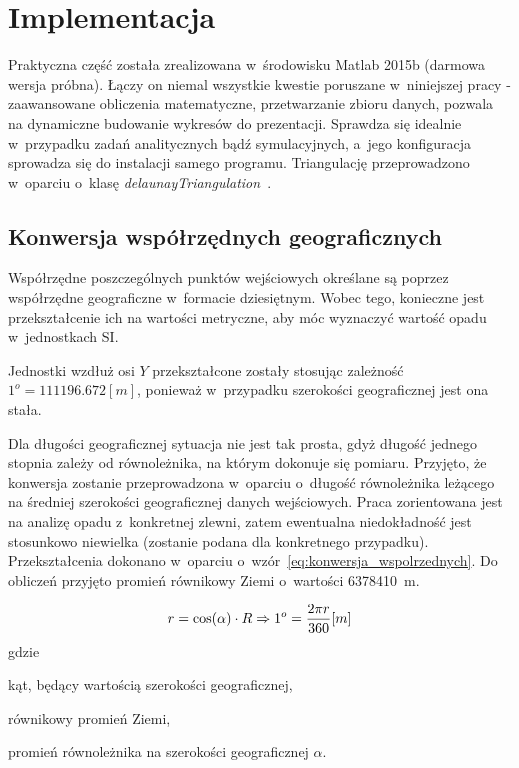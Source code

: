 \chapter{Implementacja}
\label{cha:implementacja}

Praktyczna część została zrealizowana w~środowisku Matlab 2015b (darmowa wersja próbna). Łączy on niemal wszystkie kwestie poruszane w~niniejszej pracy - zaawansowane obliczenia matematyczne, przetwarzanie zbioru danych, pozwala na dynamiczne budowanie wykresów do prezentacji. Sprawdza się idealnie w~przypadku zadań analitycznych bądź symulacyjnych, a~jego konfiguracja sprowadza się do instalacji samego programu. Triangulację przeprowadzono w~oparciu o~klasę \textit{delaunayTriangulation}~\cite{delaunayTriangulation}.

\section{Konwersja współrzędnych geograficznych}
Współrzędne poszczególnych punktów wejściowych określane są poprzez współrzędne geograficzne w~formacie dziesiętnym. Wobec tego, konieczne jest przekształcenie ich na wartości metryczne, aby móc wyznaczyć wartość opadu w~jednostkach SI.

Jednostki wzdłuż osi $Y$ przekształcone zostały stosując zależność $1^o=111196.672 [m]$, ponieważ w~przypadku szerokości geograficznej jest ona stała.

Dla długości geograficznej sytuacja nie jest tak prosta, gdyż długość jednego stopnia zależy od równoleżnika, na którym dokonuje się pomiaru. Przyjęto, że konwersja zostanie przeprowadzona w~oparciu o~długość równoleżnika leżącego na średniej szerokości geograficznej danych wejściowych. Praca zorientowana jest na analizę opadu z~konkretnej zlewni, zatem ewentualna niedokładność jest stosunkowo niewielka (zostanie podana dla konkretnego przypadku). Przekształcenia dokonano w~oparciu o~wzór~\ref{eq:konwersja_wspolrzednych}. Do obliczeń przyjęto promień równikowy Ziemi o~wartości 6378410~m.

\begin{equation}
	r = \cos(\alpha) \cdot R \Rightarrow 1^o = \frac{2 \pi r}{360} [m] \\
	\label{eq:konwersja_wspolrzednych}
\end{equation}
gdzie
\begin{description}[leftmargin=2cm, itemsep=0cm, labelsep=0cm]
	\item[$\alpha$] kąt, będący wartością szerokości geograficznej,
	\item[$R$] równikowy promień Ziemi,
	\item[$r$] promień równoleżnika na szerokości geograficznej $\alpha$.
\end{description}


